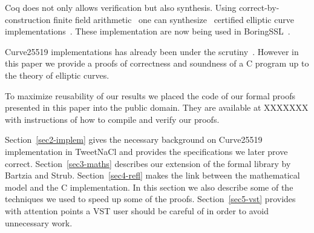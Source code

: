 Coq does not only allows verification but also synthesis.
Using correct-by-construction finite field arithmetic~\cite{Philipoom2018CorrectbyconstructionFF}
one can synthesize~\cite{Erbsen2016SystematicSO} certified elliptic curve
implementations~\cite{Erbsen2017CraftingCE}. These implementation are now being used in BoringSSL~\cite{fiat-crypto}.

Curve25519 implementations has already been under the scrutiny~\cite{Chen2014VerifyingCS}.
However in this paper we provide a proofs of correctness and soundness of a C program up to
the theory of elliptic curves.


To maximize reusability of our results we placed the code of our formal proofs
presented in this paper into the public domain. They are available at XXXXXXX
with instructions of how to compile and verify our proofs.

Section~\ref{sec2-implem} gives the necessary background on Curve25519
implementation in TweetNaCl and provides the specifications we later prove correct.
Section~\ref{sec3-maths} describes our extension of the formal library by Bartzia and Strub.
Section~\ref{sec4-refl} makes the link between the mathematical model and the C implementation.
In this section we also describe some of the techniques we used to speed up some of the proofs.
Section~\ref{sec5-vst} provides with attention points a VST user should be careful
of in order to avoid unnecessary work.



%
%
